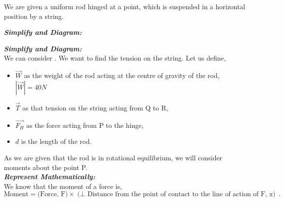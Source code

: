 %
%
%


\begin{subquestions}
	
\subquestion
We are given a uniform rod hinged at a point, which is suspended in a horizontal position by a string.

\begin{subsubquestions}

\subsubquestion
	
\textbf{\textit{Simplify and Diagram:}} \\


\subsubquestion

\textbf{\textit{Simplify and Diagram:}} \\
We can consider . We want to find the tension on the string. Let us define,
\begin{itemize}
	\item $\vec{W}$ as the weight of the rod acting at the centre of gravity of the rod, $|\vec{W}|=40N$
	\item $\vec{T}$ as that tension on the string acting from Q to R,
	\item $\vec{F_H}$ as the force acting from P to the hinge,
	\item $d$ is the length of the rod.
\end{itemize}
As we are given that the rod is in rotational equilibrium, we will consider moments about the point P.\\




\textbf{\textit{Represent Mathematically:}} \\
We know that the moment of a force is,
\begin{equation}
	\text{Moment} = \text{(Force, F)} \times \text{($\perp$ Distance from the point of contact to the line of action of F, x)} \,.
\end{equation}


\end{subsubquestions}
\end{subquestions}
